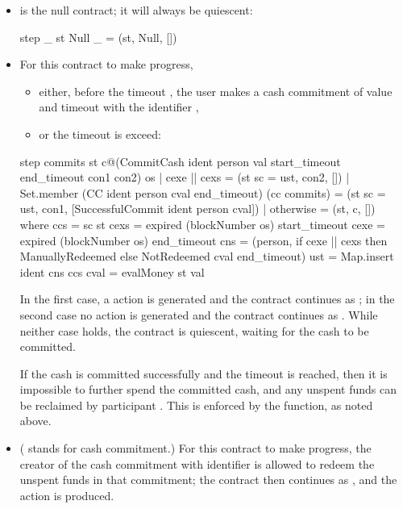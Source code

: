 \documentclass[runningheads]{llncs}
\begin{document}
\begin{itemize}
\item {} is the null contract; it will always be quiescent:

\begin{haskellcode}
step _ st Null _ = (st, Null, [])
\end{haskellcode}

\medskip
\noindent
\item {}  For this contract to make 
progress,\begin{itemize}
\item either, before the timeout , the user  makes a cash commitment 
of value 
 and timeout   with the identifier , 
\item
or the timeout  is exceed:
\end{itemize} 

\begin{haskellcode}
step 
  commits 
  st 
  c@(CommitCash ident person val start_timeout end_timeout con1 con2) 
  os
  | cexe || cexs = (st {sc = ust}, con2, [])
  | Set.member (CC ident person cval end_timeout) (cc commits)
        = (st {sc = ust}, con1, [SuccessfulCommit ident person cval])
  | otherwise = (st, c, [])
  where ccs = sc st
        cexs = expired (blockNumber os) start_timeout
        cexe = expired (blockNumber os) end_timeout
        cns = (person, if cexe || cexs 
                          then ManuallyRedeemed 
                          else NotRedeemed cval end_timeout)
        ust = Map.insert ident cns ccs
        cval = evalMoney st val
\end{haskellcode}
In the first case, a  action is generated and the contract continues as 
; in the second case no action is generated and the contract continues as 
. While neither case holds, the contract is quiescent, waiting for the cash to be committed. 

If the cash is committed successfully and the timeout  is reached, then it is impossible to 
further spend the committed cash, and any unspent funds can be reclaimed by participant .
 This is enforced by the  function, as noted above.

\medskip
\noindent
\item {} ( stands for cash commitment.) For this contract to make 
progress, the creator of the cash commitment with identifier  is allowed to redeem the unspent 
funds in that commitment; the contract then continues as , and the action 
 is produced. 


\end{itemize}
\end{document}
